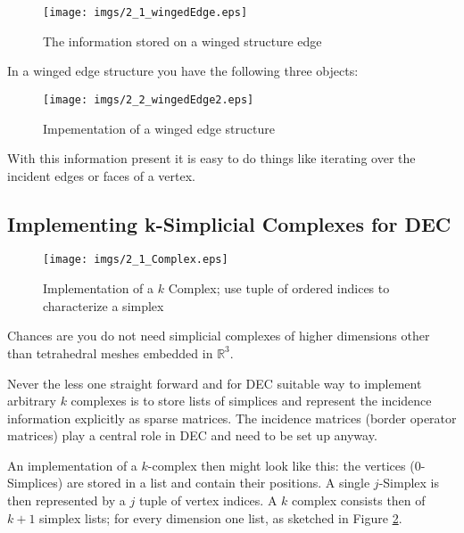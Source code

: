 \begin{figure}[tb]
\begin{center}
\texttt{[image: imgs/2\_1\_wingedEdge.eps]}%
\end{center}
\caption{The information stored on a winged structure edge}%
\label{figs::2_1_wingedEdge}%
\end{figure}

In a winged edge structure you have the following three objects:
\begin{figure}[h]
\begin{center}
\texttt{[image: imgs/2\_2\_wingedEdge2.eps]}
\caption{Impementation of a winged edge structure}
\end{center}
\end{figure}

With this information present it is easy to do things like iterating over the incident edges or faces of a vertex.



\subsection{Implementing k-Simplicial Complexes for DEC}

\begin{figure}%
	\begin{center}
	\texttt{[image: imgs/2\_1\_Complex.eps]}%
	\end{center}
	\caption{Implementation of a $k$ Complex; use tuple of ordered indices to characterize a simplex}%
	\label{fig::2_1_Complex}%
\end{figure}

Chances are you do not need simplicial complexes of higher dimensions other than tetrahedral meshes embedded in $\mathbb R^3$. 
	
Never the less one straight forward and for DEC suitable way to implement arbitrary $k$ complexes is to store lists of simplices and represent the incidence information explicitly as sparse matrices. The incidence matrices (border operator matrices) play a central role in DEC and need to be set up anyway.

An implementation of a $k$-complex then might look like this: the vertices (0-Simplices) are stored in a list and contain their positions. A single $j$-Simplex is then represented by a $j$ tuple of vertex indices. A $k$ complex consists then of $k+1$ simplex lists; for every dimension one list, as sketched in Figure \ref{fig::2_1_Complex}.

